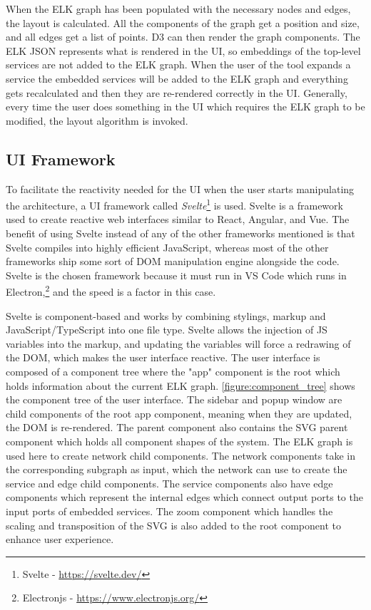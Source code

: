 When the ELK graph has been populated with the necessary nodes and edges, the layout is calculated. All the components of the graph get a position and size, and all edges get a list of points. D3 can then render the graph components.
The ELK JSON represents what is rendered in the UI, so embeddings of the top-level services are not added to the ELK graph. When the user of the tool expands a service the embedded services will be added to the ELK graph and
everything gets recalculated and then they are re-rendered correctly in the UI. Generally, every time the user does something in the UI which requires the ELK graph to be modified, the layout algorithm is invoked.

\subsection{UI Framework}
To facilitate the reactivity needed for the UI when the user starts manipulating the architecture, a UI framework called \emph{Svelte}\footnote{Svelte - \url{https://svelte.dev/}} is used.
Svelte is a framework used to create reactive web interfaces similar to React, Angular, and Vue. The benefit of using Svelte instead of any of the other frameworks mentioned is that Svelte compiles into highly efficient JavaScript,
whereas most of the other frameworks ship some sort of DOM manipulation engine alongside the code. Svelte is the chosen framework because it must run in VS Code which runs in Electron,\footnote{Electronjs - \url{https://www.electronjs.org/}} and the speed is a factor in this case.

Svelte is component-based and works by combining stylings, markup and JavaScript/TypeScript into one file type. Svelte allows the injection of JS variables into the markup, and updating the variables will force a redrawing of the DOM, which makes the user interface reactive.
The user interface is composed of a component tree where the "app" component is the root which holds information about the current ELK graph. \cref{figure:component_tree} shows the component tree of the user interface. The sidebar and popup window are child components of the root app component, meaning when they are updated, the DOM is re-rendered. 
The parent component also contains the SVG parent component which holds all component shapes of the system.
The ELK graph is used here to create network child components. The network components take in the corresponding subgraph as input, which the network can use to create the service and edge child components.
The service components also have edge components which represent the internal edges which connect output ports to the input ports of embedded services.
The zoom component which handles the scaling and transposition of the SVG is also added to the root component to enhance user experience.


